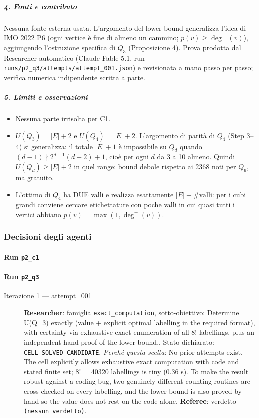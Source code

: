 \documentclass[11pt,a4paper]{article}
\providecommand{\tightlist}{\setlength{\itemsep}{0pt}\setlength{\parskip}{0pt}}
\begin{document}
\subparagraph{4. Fonti e contributo}\label{fonti-e-contributo}

Nessuna fonte esterna usata. L'argomento del lower bound generalizza
l'idea di IMO 2022 P6 (ogni vertice è fine di almeno un cammino;
\(p(v)\ge\deg^-(v)\)), aggiungendo l'ostruzione specifica di \(Q_3\)
(Proposizione 4). Prova prodotta dal Researcher automatico (Claude Fable
5.1, run \texttt{runs/p2\_q3/attempts/attempt\_001.json}) e revisionata
a mano passo per passo; verifica numerica indipendente scritta a parte.

\subparagraph{5. Limiti e osservazioni}\label{limiti-e-osservazioni}

\begin{itemize}
\tightlist
\item
  Nessuna parte irrisolta per C1.
\item
  \(U(Q_3)=|E|+2\) e \(U(Q_4)=|E|+2\). L'argomento di parità di \(Q_4\)
  (Step 3--4) si generalizza: il totale \(|E|+1\) è impossibile su
  \(Q_d\) quando \((d-1)\nmid 2^{d-1}(d-2)+1\), cioè per ogni \(d\) da 3
  a 10 almeno. Quindi \(U(Q_d)\ge|E|+2\) in quel range: bound debole
  rispetto ai 2368 noti per \(Q_9\), ma gratuito.
\item
  L'ottimo di \(Q_4\) ha DUE valli e realizza esattamente
  \(|E|+\#\text{valli}\): per i cubi grandi conviene cercare
  etichettature con poche valli in cui quasi tutti i vertici abbiano
  \(p(v)=\max(1,\deg^-(v))\).
\end{itemize}

\subsubsection{Decisioni degli agenti}
\paragraph{Run \texttt{p2\_c1}}
\paragraph{Run \texttt{p2\_q3}}
\begin{description}
\item[Iterazione 1 — attempt\_001]
\textbf{Researcher}: famiglia \texttt{exact\_computation}, sotto-obiettivo: Determine U(Q\_3) exactly (value + explicit optimal labelling in the required format), with certainty via exhaustive exact enumeration of all 8! labellings, plus an independent hand proof of the lower bound.. Stato dichiarato: \texttt{CELL\_SOLVED\_CANDIDATE}.
\emph{Perché questa scelta}: No prior attempts exist. The cell explicitly allows exhaustive exact computation with code and stated finite set; 8! = 40320 labellings is tiny (0.36 s). To make the result robust against a coding bug, two genuinely different counting routines are cross-checked on every labelling, and the lower bound is also proved by hand so the value does not rest on the code alone.
\textbf{Referee}: verdetto \texttt{(nessun verdetto)}.
\end{description}
\end{document}
